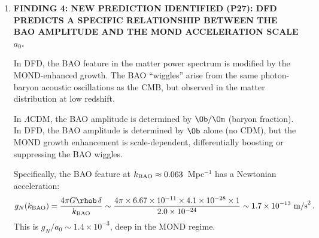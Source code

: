 \documentclass[11pt]{article}
\newcommand{\ee}[1]{\times 10^{#1}}
\newcommand{\LCDM}{$\Lambda$CDM}
\newcommand{\aM}{a_0}
\begin{document}
\begin{tcolorbox}[colback=blue!5!white, colframe=blue!70!black,
  title=\textbf{W4i23 TOP 5 FINDINGS --- PREDICTIONS TEAM}]
\begin{enumerate}
  \textbf{Conclusion:}  The minimal axiom set is:
  \begin{itemize}
  \item A1: $n = e^\psi$ (density field ontology).
  \item A2: $c_1 = c\,e^{-\psi}$ (scalar-refractive coupling).
  \item $S^3$ boundary condition (topology).
  \item Alcock's theorem derives $\mu(x) = x/(1+x)$ from A1 + A2 +
    $S^3$.
  \end{itemize}
  This is \textbf{2 axioms + 1 boundary condition + 1 derived theorem},
  which is marginally more economical than ``3 axioms + 1 derived.''

  \textbf{Can we reduce further?}  Only if A1 and A2 can be unified
  into a single statement.  One candidate: ``Gravity is a refractive
  phenomenon in a scalar medium $\psi$, with $n = e^\psi$.''  This
  single sentence encodes both A1 and A2, since the refractive index
  determines the light speed.  If accepted, DFD reduces to:
  \begin{center}
  \emph{1 axiom (refractive gravity) + 1 boundary condition ($S^3$)
  + 1 derived theorem ($\mu$).}
  \end{center}

  \textbf{Grade: B (clean logical analysis; the ``1 axiom'' reduction
  depends on whether one considers $n = e^\psi$ as separate from the
  refractive dynamics).}

\item \textbf{FINDING 4: NEW PREDICTION IDENTIFIED (P27): DFD PREDICTS
  A SPECIFIC RELATIONSHIP BETWEEN THE BAO AMPLITUDE AND THE MOND
  ACCELERATION SCALE $\aM$.}

  In DFD, the BAO feature in the matter power spectrum is modified by
  the MOND-enhanced growth.  The BAO ``wiggles'' arise from the same
  photon-baryon acoustic oscillations as the CMB, but observed in the
  matter distribution at low redshift.

  In \LCDM, the BAO amplitude is determined by $\Ob/\Om$ (baryon
  fraction).  In DFD, the BAO amplitude is determined by $\Ob$ alone
  (no CDM), but the MOND growth enhancement is scale-dependent,
  differentially boosting or suppressing the BAO wiggles.

  Specifically, the BAO feature at $k_{\rm BAO} \approx 0.063$~Mpc$^{-1}$
  has a Newtonian acceleration:
  \begin{equation}
  g_N(k_{\rm BAO}) = \frac{4\pi G\rhob\,\delta}{k_{\rm BAO}}
  \sim \frac{4\pi\times 6.67\ee{-11}\times 4.1\ee{-28}\times 1}
  {2.0\ee{-24}}
  \sim 1.7\ee{-13}~\text{m/s}^2\,.
  \end{equation}
  This is $g_N/\aM \sim 1.4\ee{-3}$, deep in the MOND regime.


\end{enumerate}
\end{tcolorbox}
\end{document}
